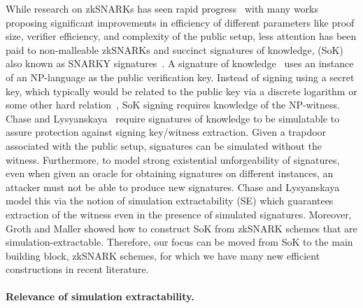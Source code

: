 While research on zkSNARKs has seen rapid
progress~\cite{EC:GGPR13,AC:Groth10a,TCC:Lipmaa12,TCC:BCIOP13,SP:PHGR13,C:BCGTV13,AC:Lipmaa13,USENIX:BCTV14,EC:Groth16}
with many works proposing significant improvements in efficiency of different
parameters like proof size, verifier efficiency, and complexity of the public setup,
less attention has been paid to non-malleable zkSNARKs and succinct signatures of
knowledge, (SoK) also known as SNARKY signatures~\cite{C:GroMal17,EPRINT:BKSV20}. A
signature of knowledge~\cite{C:CamSta97,C:ChaLys06} uses an instance of an
NP-language as the public verification key. Instead of signing using a secret key,
which typically would be related to the public key via a discrete logarithm or some
other hard relation~\cite{AC:DHLW10}, SoK signing requires knowledge of the
NP-witness. Chase and Lysyanskaya~\cite{C:ChaLys06} require signatures of knowledge
to be simulatable to assure protection against signing key/witness extraction. Given
a trapdoor associated with the public setup, signatures can be simulated without the
witness. Furthermore, to model strong existential unforgeability of signatures, even
when given an oracle for obtaining signatures on different instances, an attacker
must not be able to produce new signatures. Chase and Lysyanskaya model this via the
notion of simulation extractability (SE) which guarantees extraction of the witness
even in the presence of simulated signatures.  Moreover, Groth and Maller
\cite{C:GroMal17} showed how to construct SoK from zkSNARK schemes that are
simulation-extractable.  Therefore, our focus can be moved from SoK to the main
building block, zkSNARK schemes, for which we have many new efficient constructions
in recent literature.
 

\paragraph{Relevance of simulation extractability.}

